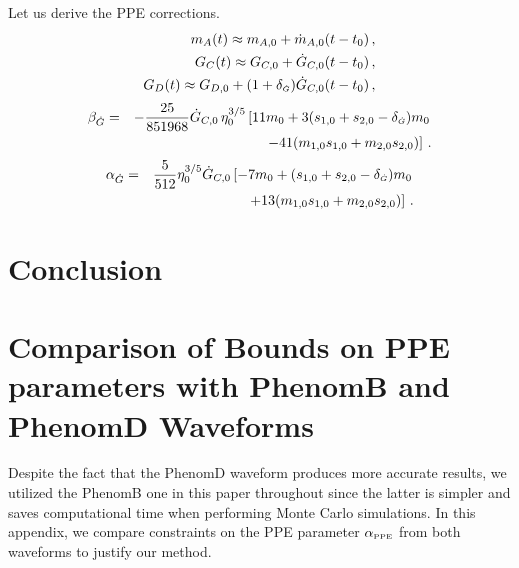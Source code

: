 \documentclass[prd,twocolumn,nofootinbib]{revtex4-1}
\newcommand{\PPE}{{\mbox{\tiny PPE}}}
\newcommand{\Gdot}{{\mbox{\tiny $\dot G$}}}
\begin{document}
Let us derive the PPE corrections.
 \begin{eqnarray}\label{eq:3.7a2}
 m_A(t)\approx m_{A,0}+\dot{m}_{A,0}(t-t_0)\,, \\
   \label{eq:3.7a4}  G_C(t)\approx  G_{C,0}+\dot{G}_{C,0}(t-t_0)\,, \\
   \label{eq:3.7a4-2}  G_D(t)\approx  G_{D,0}+(1+\delta_\Gdot)\dot{G}_{C,0}(t-t_0)\, , 
 \end{eqnarray}
 \begin{eqnarray}\label{eq:beta_gdot}
 \beta_{\dot{G}}&=&-\frac{25}{851968}\dot{G}_{C,0}\,\eta_0^{3/5}\left[11m_0 +3(s_{1,0}+s_{2,0}-\delta_\Gdot)m_0 \right. \nonumber \\
 && \left. -41 (m_{1,0}s_{1,0}+m_{2,0}s_{2,0})\right]\,. 
  \end{eqnarray}
\begin{eqnarray}
\label{eq:3.7d2}
 \alpha_{\dot{G}}&=&\frac{5}{512}\eta_0^{3/5}\dot{G}_{C,0}\left[-7m_0+(s_{1,0}+s_{2,0}-\delta_\Gdot)m_0 \right. \nonumber \\
 && \left.+13 (m_{1,0}s_{1,0}+m_{2,0}s_{2,0})\right]\,.
 \end{eqnarray}
\section{Conclusion}
\acknowledgments
 \appendix 
\section{Comparison of Bounds on PPE parameters with PhenomB and PhenomD Waveforms}\label{Appendix}

Despite the fact that the PhenomD waveform produces more accurate results, we utilized the PhenomB one in this paper throughout since the latter is simpler and saves computational time when performing Monte Carlo simulations. In this appendix, we compare constraints on the PPE parameter $\alpha_\PPE$ from both waveforms to justify our method. 
 
\end{document}
